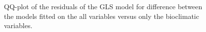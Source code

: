 \begin{figure}
\caption{\label{fig:ResidualGLSDiff}QQ-plot of the residuals of the GLS model for difference between the models fitted on the all variables versus only the bioclimatic variables.}
\end{figure}

\restoregeometry